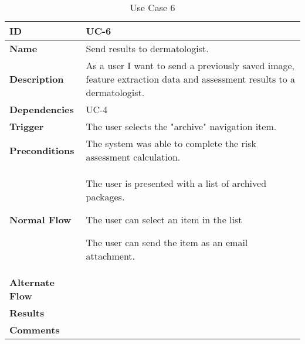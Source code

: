 \begin{table}[H]
    \begin{tabular}{ | >{\bfseries}l | p{9.5cm} |}
    \hline
    ID
    &  UC-6 \\ \hline
    Name
    & Send results to dermatologist. \\ \hline
    Description
    &  As a user I want to send a previously saved image, feature extraction data and assessment results to a dermatologist. \\ \hline
    Dependencies
    & UC-4 \\ \hline
    Trigger
    & The user selects the "archive" navigation item. \\ \hline
    Preconditions
    & The system was able to complete the risk assessment calculation. \\ \hline
    Normal Flow
    &
    \begin{description}[align=left]
    \item [1.]The user is presented with a list of archived packages.
    \item [2.]The user can select an item in the list
    \item [3.]The user can send the item as an email attachment.
    \end{description}
    \\ \hline
    Alternate Flow
    &

    \\ \hline
    Results
    &
    \\ \hline
    Comments
    &  \\ \hline
    \end{tabular}

    \caption{Use Case 6}
    \label{fig:uc_6}
\end{table}